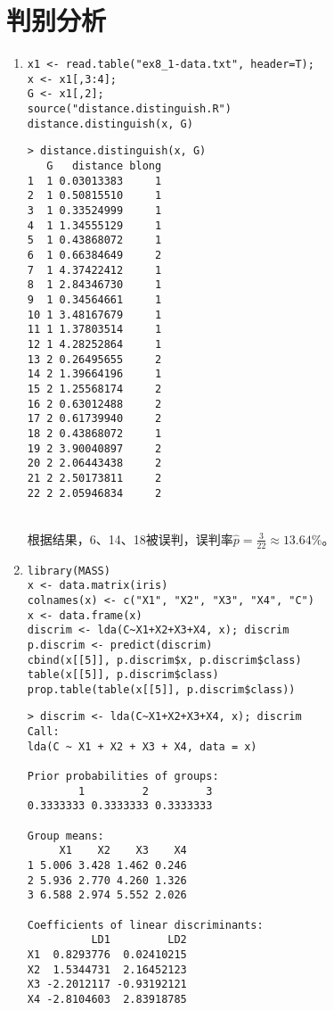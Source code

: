 \section{判别分析}
    \begin{enumerate}
        \item
        \code
\begin{lstlisting}
x1 <- read.table("ex8_1-data.txt", header=T);
x <- x1[,3:4];
G <- x1[,2];
source("distance.distinguish.R")
distance.distinguish(x, G)
\end{lstlisting}
        \out
\begin{lstlisting}
> distance.distinguish(x, G)
   G   distance blong
1  1 0.03013383     1
2  1 0.50815510     1
3  1 0.33524999     1
4  1 1.34555129     1
5  1 0.43868072     1
6  1 0.66384649     2
7  1 4.37422412     1
8  1 2.84346730     1
9  1 0.34564661     1
10 1 3.48167679     1
11 1 1.37803514     1
12 1 4.28252864     1
13 2 0.26495655     2
14 2 1.39664196     1
15 2 1.25568174     2
16 2 0.63012488     2
17 2 0.61739940     2
18 2 0.43868072     1
19 2 3.90040897     2
20 2 2.06443438     2
21 2 2.50173811     2
22 2 2.05946834     2
\end{lstlisting}
        \summary\\
        根据结果，6、14、18被误判，误判率$\displaystyle \hat{p}=\frac{3}{22} \approx 13.64\%$。
        \item
        \code
\begin{lstlisting}
library(MASS)
x <- data.matrix(iris)
colnames(x) <- c("X1", "X2", "X3", "X4", "C")
x <- data.frame(x)
discrim <- lda(C~X1+X2+X3+X4, x); discrim
p.discrim <- predict(discrim)
cbind(x[[5]], p.discrim$x, p.discrim$class)
table(x[[5]], p.discrim$class)
prop.table(table(x[[5]], p.discrim$class))
\end{lstlisting}
        \out
\begin{lstlisting}
> discrim <- lda(C~X1+X2+X3+X4, x); discrim
Call:
lda(C ~ X1 + X2 + X3 + X4, data = x)

Prior probabilities of groups:
        1         2         3 
0.3333333 0.3333333 0.3333333 

Group means:
     X1    X2    X3    X4
1 5.006 3.428 1.462 0.246
2 5.936 2.770 4.260 1.326
3 6.588 2.974 5.552 2.026

Coefficients of linear discriminants:
          LD1         LD2
X1  0.8293776  0.02410215
X2  1.5344731  2.16452123
X3 -2.2012117 -0.93192121
X4 -2.8104603  2.83918785


\end{lstlisting}
\end{enumerate}
